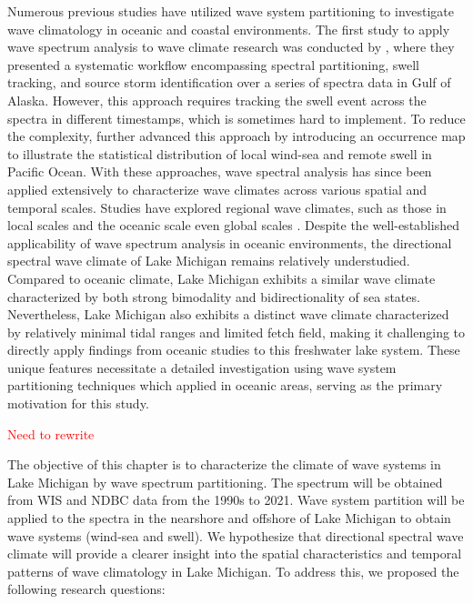 Numerous previous studies have utilized wave system partitioning to investigate
wave climatology in oceanic and coastal environments. The first study to apply
wave spectrum analysis to wave climate research was conducted by
\citet{hanson_automated_2001}, where they presented a systematic workflow
encompassing spectral partitioning, swell tracking, and source storm
identification over a series of spectra data in Gulf of Alaska. However, this
approach requires tracking the swell event across the spectra in different
timestamps, which is sometimes hard to implement. To reduce the complexity,
\citet{portilla-yandun_wave_2015,portilla-yandun_climate_2016} further advanced
this approach by introducing an occurrence map to illustrate the statistical
distribution of local wind-sea and remote swell in Pacific Ocean. With these
approaches, wave spectral analysis has since been applied extensively to
characterize wave climates across various spatial and temporal scales. Studies
have explored regional wave climates, such as those in local scales
\citep{romano-moreno_multimodal_2023,venolia_historical_2024,zheng_investigation_2024}
and the oceanic scale
\citep{jiang_wave_2019,langodan_unraveling_2018,portilla-yandun_climate_2016}
even global scales \citep{echevarria_seasonal_2019,echevarria_influence_2020}.
Despite the well-established applicability of wave spectrum analysis in oceanic
environments, the directional spectral wave climate of Lake Michigan remains
relatively understudied. Compared to oceanic climate, Lake Michigan exhibits a
similar wave climate characterized by both strong bimodality and
bidirectionality of sea states. Nevertheless, Lake Michigan also exhibits a
distinct wave climate characterized by relatively minimal tidal ranges and
limited fetch field, making it challenging to directly apply findings from
oceanic studies to this freshwater lake system. These unique features
necessitate a detailed investigation using wave system partitioning techniques
which applied in oceanic areas, serving as the primary motivation for this
study.

\textcolor{red}{Need to rewrite}

The objective of this chapter is to characterize the climate of wave systems in
Lake Michigan by wave spectrum partitioning. The spectrum will be obtained from
WIS and NDBC data from the 1990s to 2021. Wave system partition will be applied
to the spectra in the nearshore and offshore of Lake Michigan to obtain wave
systems (wind-sea and swell). We hypothesize that directional spectral wave
climate will provide a clearer insight into the spatial characteristics and
temporal patterns of wave climatology in Lake Michigan. To address this, we
proposed the following research questions: 

